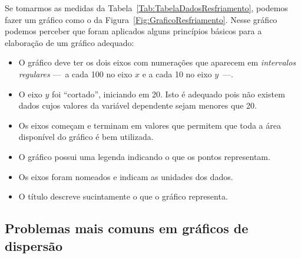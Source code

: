 Se tomarmos as medidas da Tabela~\ref{Tab:TabelaDadosResfriamento}, podemos fazer um gráfico como o da Figura~\ref{Fig:GraficoResfriamento}. Nesse gráfico podemos perceber que foram aplicados alguns princípios básicos para a elaboração de um gráfico adequado:
\begin{itemize}
	\item O gráfico deve ter os dois eixos com numerações que aparecem em \emph{intervalos regulares} ---~a cada 100 no eixo $x$ e a cada 10 no eixo $y$~---.
	\item O eixo $y$ foi ``cortado'', iniciando em 20. Isto é adequado pois não existem dados cujos valores da variável dependente sejam menores que 20.
	\item Os eixos começam e terminam em valores que permitem que toda a área disponível do gráfico é bem utilizada.
	\item O gráfico possui uma legenda indicando o que os pontos representam.
	\item Os eixos foram nomeados e indicam as unidades dos dados.
	\item O título descreve sucintamente o que o gráfico representa. \end{itemize}

\begin{figure*}[!htb]
\centering
\caption{Gráfico dos dados da Tabela~\ref{Tab:TabelaDadosResfriamento}.}
\label{Fig:GraficoResfriamento}

\end{figure*}

\subsection{Problemas mais comuns em gráficos de dispersão}


